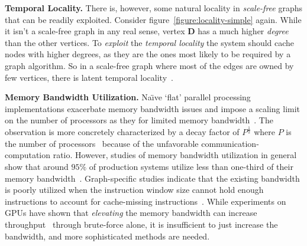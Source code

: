 \textbf{Temporal Locality.} 
There is, however, some natural locality in \textit{scale-free} graphs that can be readily exploited. 
Consider figure~\ref{figure:locality-simple} again. 
While it isn't a scale-free graph in any real sense, vertex \textbf{D} has a much higher \textit{degree} than the other vertices. 
To \textit{exploit} the \textit{temporal locality} the system should cache nodes with higher degrees, as they are the ones most likely to be required by a graph algorithm.
So in a scale-free graph where most of the edges are owned by few vertices, there is latent temporal locality~\cite{Beamer2015}.



\textbf{Memory Bandwidth Utilization.} 
Na\"{\i}ve `flat' parallel processing implementations exacerbate memory bandwidth issues and impose a scaling limit on the number of processors as they for limited memory bandwidth~\cite{Fu2014}.
The observation is more concretely characterized by a decay factor of $P^{\frac{1}{2}}$ where $P$ is the number of processors~\cite{Buluc2012} because of the unfavorable communication-computation ratio.
However, studies of memory bandwidth utilization in general show that around $95\%$ of production systems utilize less than one-third of their memory bandwidth~\cite{Kanev2015}.
Graph-specific studies indicate that the existing bandwidth is poorly utilized when the instruction window size cannot hold enough instructions to account for cache-missing instructions~\cite{Beamer2015}.
While experiments on GPUs have shown that \textit{elevating} the memory bandwidth can increase throughput~\cite{Wu2015} through brute-force alone, it is insufficient to just increase the bandwidth, and more sophisticated methods are needed. 

